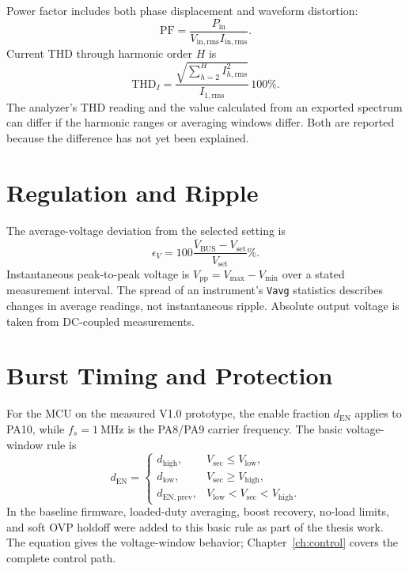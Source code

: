 Power factor includes both phase displacement and waveform distortion:
\begin{equation}
\mathrm{PF}=\frac{P_{\mathrm{in}}}{V_{\mathrm{in,rms}}I_{\mathrm{in,rms}}}.
\label{eq:app-pf}
\end{equation}
Current THD through harmonic order \(H\) is
\begin{equation}
\mathrm{THD}_I=\frac{\sqrt{\sum_{h=2}^{H} I_{h,\mathrm{rms}}^2}}{I_{1,\mathrm{rms}}}\,100\%.
\label{eq:app-thd}
\end{equation}
The analyzer's THD reading and the value calculated from an exported spectrum can differ if the harmonic ranges or averaging windows differ. Both are reported because the difference has not yet been explained.

\section{Regulation and Ripple}

The average-voltage deviation from the selected setting is
\begin{equation}
\epsilon_V=100\frac{\overline{V}_{\mathrm{BUS}}-V_{\mathrm{set}}}{V_{\mathrm{set}}}\%.
\end{equation}
Instantaneous peak-to-peak voltage is \(V_{\mathrm{pp}}=V_{\max}-V_{\min}\) over a stated measurement interval. The spread of an instrument's \texttt{Vavg} statistics describes changes in average readings, not instantaneous ripple. Absolute output voltage is taken from DC-coupled measurements.

\section{Burst Timing and Protection}

For the MCU on the measured V1.0 prototype, the enable fraction \(d_{\mathrm{EN}}\) applies to PA10, while \(f_s=\SI{1}{\mega\hertz}\) is the PA8/PA9 carrier frequency. The basic voltage-window rule is
\begin{equation}
d_{\mathrm{EN}}=\begin{cases}
d_{\mathrm{high}},&V_{\mathrm{sec}}\leq V_{\mathrm{low}},\\
d_{\mathrm{low}},&V_{\mathrm{sec}}\geq V_{\mathrm{high}},\\
d_{\mathrm{EN,prev}},&V_{\mathrm{low}}<V_{\mathrm{sec}}<V_{\mathrm{high}}.
\end{cases}
\label{eq:app-bangbang}
\end{equation}
In the baseline firmware, loaded-duty averaging, boost recovery, no-load limits, and soft OVP holdoff were added to this basic rule as part of the thesis work. The equation gives the voltage-window behavior; Chapter~\ref{ch:control} covers the complete control path.

